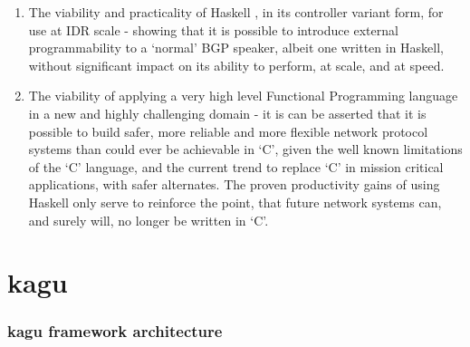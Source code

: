 \begin{enumerate}
    \item The viability and practicality of  Haskell  \hbgp, in its controller variant form, for use at IDR scale - showing that it is possible to introduce external programmability to a `normal' BGP speaker, albeit one written in Haskell, without significant impact on its ability to perform, at scale, and at speed.
    \item The viability of applying a very high level Functional Programming language in a new and highly challenging domain - it is can be asserted that it is possible to build safer, more reliable and more flexible network protocol systems than could ever be achievable in `C', given the well known limitations of the `C' language, and the current trend to replace `C' in mission critical applications, with safer alternates.  The proven productivity gains of using Haskell only serve to reinforce the point, that future network systems can, and surely will, no longer be written in `C'.
\end{enumerate}

\section{kagu}


\subsubsection*{ kagu framework architecture}

